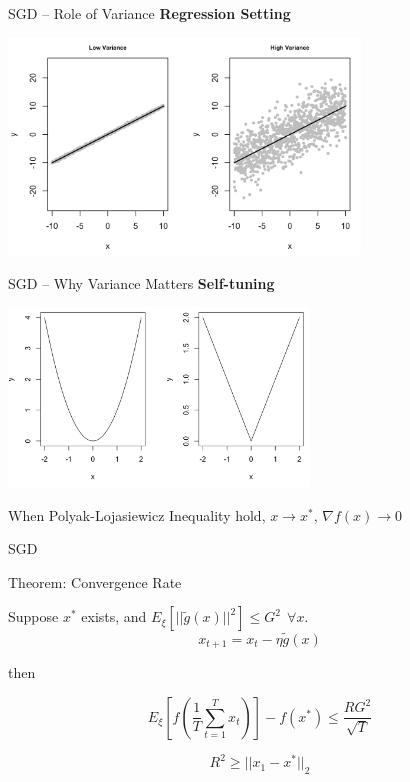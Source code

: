 \documentclass[aspectratio=169,xcolor=dvipsnames]{beamer}
\begin{document}

\begin{frame}{SGD -- Role of Variance}
\textbf{Regression Setting}

\begin{center}
	\includegraphics[width = 0.7\textwidth]{variance}
\end{center}
\end{frame}

\begin{frame}{SGD -- Why Variance Matters}
\textbf{Self-tuning}
\begin{center}
	\includegraphics[width = 0.6\textwidth]{selftuning}
\end{center}
\begin{center}
	When Polyak-Lojasiewicz Inequality hold, $x \to x^*$, $\nabla f(x) \to 0$
\end{center}
\end{frame}


\begin{frame}{SGD}

\begin{block}{Theorem: Convergence Rate}

Suppose $x^*$ exists, and $E_\xi[||\tilde g(x)||^2] \le G^2\ \ \forall x$.
\begin{equation*}
	x_{t+1} = x_t - \eta \tilde g(x)
\end{equation*}

then 

\begin{equation*}
	E_\xi[f(\frac{1}{T} \sum_{t = 1}^T x_t)] - f(x^*) \le \frac{R G^2}{\sqrt T}
\end{equation*}

$$R^2 \ge ||x_1 - x^* ||_2$$

\end{block}


\end{frame}
\end{document}
